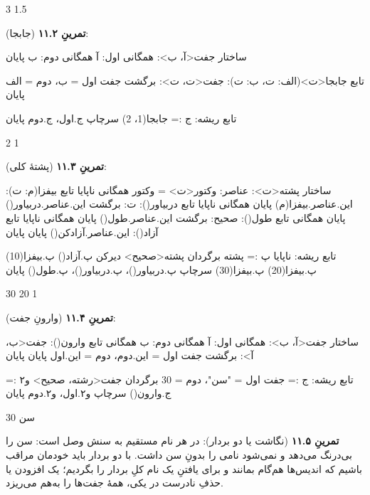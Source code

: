 \begin{progoutfa}
3
1.5
\end{progoutfa}

\textbf{تمرینِ ۱۱.۲} (جابجا):
\begin{salamfa}
ساختار جفت<آ، ب>:
    همگانی اول: آ
    همگانی دوم: ب
پایان

تابع جابجا<ت>(الف: ت، ب: ت): جفت<ت، ت>:
    برگشت جفت { اول = ب، دوم = الف }
پایان

تابع ریشه:
    ج := جابجا(1، 2)
    سرچاپ ج.اول، ج.دوم
پایان
\end{salamfa}

\begin{progoutfa}
2 1
\end{progoutfa}

\textbf{تمرینِ ۱۱.۳} (پشتهٔ کلی):
\begin{salamfa}
ساختار پشته<ت>:
    عناصر: وکتور<ت> = وکتور {}
    همگانی ناپایا تابع بیفزا(م: ت):
        این.عناصر.بیفزا(م)
    پایان
    همگانی ناپایا تابع دربیاور(): ت:
        برگشت این.عناصر.دربیاور()
    پایان
    همگانی تابع طول(): صحیح:
        برگشت این.عناصر.طول()
    پایان
    همگانی ناپایا تابع آزاد():
        این.عناصر.آزادکن()
    پایان
پایان

تابع ریشه:
    ناپایا پ := پشته {} برگردان پشته<صحیح>
    دیرکن پ.آزاد()
    پ.بیفزا(10)
    پ.بیفزا(20)
    پ.بیفزا(30)
    سرچاپ پ.دربیاور()، پ.دربیاور()، پ.طول()
پایان
\end{salamfa}

\begin{progoutfa}
30 20 1
\end{progoutfa}

\textbf{تمرینِ ۱۱.۴} (وارونِ جفت):
\begin{salamfa}
ساختار جفت<آ، ب>:
    همگانی اول: آ
    همگانی دوم: ب
    همگانی تابع وارون(): جفت<ب، آ>:
        برگشت جفت { اول = این.دوم، دوم = این.اول }
    پایان
پایان

تابع ریشه:
    ج := جفت { اول = "سن"، دوم = 30 } برگردان جفت<رشته، صحیح>
    و۲ := ج.وارون()
    سرچاپ و۲.اول، و۲.دوم
پایان
\end{salamfa}

\begin{progoutfa}
30 سن
\end{progoutfa}

\textbf{تمرینِ ۱۱.۵} (نگاشت یا دو بردار): در  هر نام مستقیم به سنش وصل است:  سن را بی‌درنگ می‌دهد و نمی‌شود نامی را بدونِ سن داشت. با دو بردار باید خودمان مراقب باشیم که اندیس‌ها هم‌گام بمانند و برای یافتنِ یک نام کلِ بردار را بگردیم؛ یک افزودن یا حذفِ نادرست در یکی، همهٔ جفت‌ها را به‌هم می‌ریزد.

